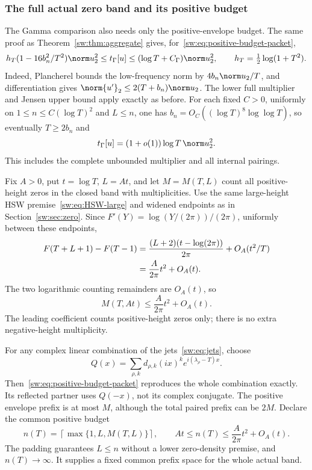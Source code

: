 \documentclass[11pt,a4paper]{article}
\numberwithin{equation}{section}
\theoremstyle{definition}\newtheorem{definition}[theorem]{Definition}
\theoremstyle{remark}\newtheorem{remark}[theorem]{Remark}
\newcommand{\tg}{t_\Gamma}\newcommand{\cg}{c_\Gamma}
\begin{document}
\subsubsection{The full actual zero band and its positive budget}
The Gamma comparison also needs only the positive-envelope budget. The same proof as Theorem~\ref{sw:thm:aggregate} gives, for~\eqref{sw:eq:positive-budget-packet},
\begin{equation}\label{sw:eq:positive-budget-gamma}
 h_T(1-16b_n^2/T^2)\norm u_2^2
 \le\tg[u]\le(\log T+C_\Gamma)\norm u_2^2,
 \qquad h_T=\tfrac12\log(1+T^2).
\end{equation}
Indeed, Plancherel bounds the low-frequency norm by $4b_n\norm u_2/T$, and differentiation gives $\norm{u'}_2\le2(T+b_n)\norm u_2$. The lower full multiplier and Jensen upper bound apply exactly as before. For each fixed $C>0$, uniformly on $1\le n\le C(\log T)^2$ and $L\le n$, one has $b_n=O_C((\log T)^8\log\log T)$, so eventually $T\ge2b_n$ and
\begin{equation}\label{sw:eq:positive-gamma-asymptotic}
 \tg[u]=(1+o(1))\log T\,\norm u_2^2.
\end{equation}
This includes the complete unbounded multiplier and all internal pairings.

Fix $A>0$, put $t=\log T$, $L=At$, and let $M=M(T,L)$ count all positive-height zeros in the closed band with multiplicities. Use the same large-height HSW premise~\eqref{sw:eq:HSW-large} and widened endpoints as in Section~\ref{sw:sec:zero}. Since $F'(Y)=\log(Y/(2\pi))/(2\pi)$, uniformly between these endpoints,
\begin{align}
 F(T+L+1)-F(T-1)
 &=\frac{(L+2)(t-\log(2\pi))}{2\pi}+O_A(t^2/T)\notag\\
 &=\frac{A}{2\pi}t^2+O_A(t).
\end{align}
The two logarithmic counting remainders are $O_A(t)$, so
\begin{equation}\label{sw:eq:sharp-band-count}
 M(T,At)\le\frac{A}{2\pi}t^2+O_A(t).
\end{equation}
The leading coefficient counts positive-height zeros only; there is no extra negative-height multiplicity.

For any complex linear combination of the jets~\eqref{sw:eq:jets}, choose
\[
 Q(x)=\sum_{\rho,k}d_{\rho,k}(ix)^k
                    e^{i(\lambda_\rho-T)x}.
\]
Then~\eqref{sw:eq:positive-budget-packet} reproduces the whole combination exactly. Its reflected partner uses $Q(-x)$, not its complex conjugate. The positive envelope prefix is at most $M$, although the total paired prefix can be $2M$. Declare the common positive budget
\begin{equation}\label{sw:eq:positive-padded-budget}
 n(T)=\left\lceil\max\{1,L,M(T,L)\}\right\rceil,
 \qquad
 At\le n(T)\le\frac{A}{2\pi}t^2+O_A(t).
\end{equation}
The padding guarantees $L\le n$ without a lower zero-density premise, and $n(T)\to\infty$. It supplies a fixed common prefix space for the whole actual band.
\end{document}
